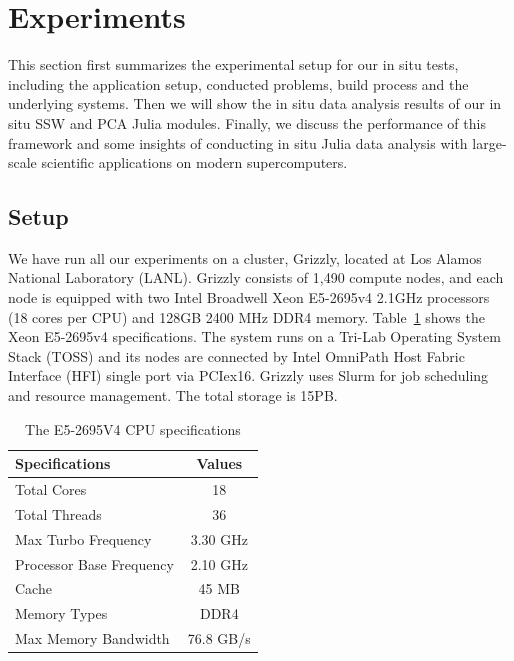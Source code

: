 \documentclass{juliacon}
\begin{document}
\section{Experiments} \label{sec5}

This section first summarizes the experimental setup for our in situ tests, including the application setup, conducted problems, build process and the underlying systems. Then we will show the in situ data analysis results of our in situ SSW and PCA Julia modules. Finally, we discuss the performance of this framework and some insights of conducting in situ Julia data analysis with large-scale scientific applications on modern supercomputers.


\subsection{Setup}

We have run all our experiments on a cluster, Grizzly, located at Los Alamos National Laboratory (LANL). Grizzly consists of 1,490 compute nodes, and each node is equipped with two Intel Broadwell Xeon E5-2695v4 2.1GHz processors (18 cores per CPU) and 128GB 2400 MHz DDR4 memory. Table~\ref{table:cpuspecs} shows the Xeon E5-2695v4 specifications. The system runs on a Tri-Lab Operating System Stack (TOSS) and its nodes are connected by Intel OmniPath Host Fabric Interface (HFI) single port via PCIex16.
Grizzly uses Slurm for job scheduling and resource management. The total storage is 15PB.



\begin{table}
\centering 
  \caption{The E5-2695V4 CPU specifications}
  \label{table:cpuspecs}
  \begin{tabular}{lc}
 \toprule
  Specifications & Values \\
 \midrule
 Total Cores  & 18 \\
 Total Threads  & 36\\
 Max Turbo Frequency   & 3.30 GHz\\
 Processor Base Frequency & 2.10 GHz\\
 Cache   & 45 MB\\
 Memory Types  & DDR4\\
 Max Memory Bandwidth & 76.8 GB/s\\
 \bottomrule
\end{tabular}
\end{table}
\end{document}
